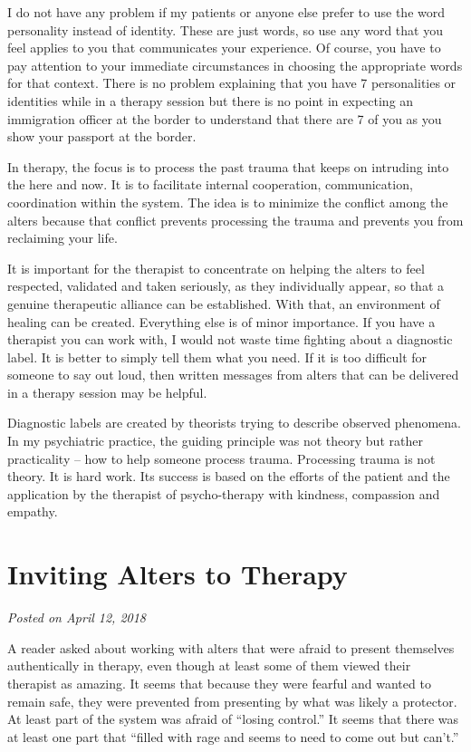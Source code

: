 \documentclass[]{book}
\begin{document}
I do not have any problem if my patients or anyone else prefer to use the word personality instead of identity. These are just words, so use any word that you feel applies to you that communicates your experience. Of course, you have to pay attention to your immediate circumstances in choosing the appropriate words for that context. There is no problem explaining that you have 7 personalities or identities while in a therapy session but there is no point in expecting an immigration officer at the border to understand that there are 7 of you as you show your passport at the border.

In therapy, the focus is to process the past trauma that keeps on intruding into the here and now. It is to facilitate internal cooperation, communication, coordination within the system. The idea is to minimize the conflict among the alters because that conflict prevents processing the trauma and prevents you from reclaiming your life.

It is important for the therapist to concentrate on helping the alters to feel respected, validated and taken seriously, as they individually appear, so that a genuine therapeutic alliance can be established. With that, an environment of healing can be created. Everything else is of minor importance. If you have a therapist you can work with, I would not waste time fighting about a diagnostic label. It is better to simply tell them what you need. If it is too difficult for someone to say out loud, then written messages from alters that can be delivered in a therapy session may be helpful.

Diagnostic labels are created by theorists trying to describe observed phenomena. In my psychiatric practice, the guiding principle was not theory but rather practicality -- how to help someone process trauma. Processing trauma is not theory. It is hard work. Its success is based on the efforts of the patient and the application by the therapist of psycho-therapy with kindness, compassion and empathy.

\hypertarget{inviting-alters-to-therapy}{%
\section{Inviting Alters to Therapy}\label{inviting-alters-to-therapy}}

\emph{Posted on April 12, 2018}

A reader asked about working with alters that were afraid to present themselves authentically in therapy, even though at least some of them viewed their therapist as amazing. It seems that because they were fearful and wanted to remain safe, they were prevented from presenting by what was likely a protector. At least part of the system was afraid of ``losing control.'' It seems that there was at least one part that ``filled with rage and seems to need to come out but can't.''
\end{document}
